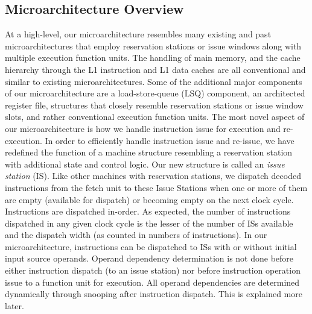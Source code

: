 \documentclass[10pt,dvips]{article}
\begin{document}
\subsection{Microarchitecture Overview}
%
At a high-level, our microarchitecture resembles many existing
and past microarchitectures that employ reservation stations
or issue windows along with multiple execution function units.
The handling of main memory, and the cache hierarchy 
through the L1 instruction and L1 data caches are all
conventional and similar to existing microarchitectures.
Some of the additional major components of our
microarchitecture are a
load-store-queue (LSQ) component, an architected register file,
structures that closely resemble reservation stations or issue
window slots, and rather conventional execution function units.
The most novel aspect of our microarchitecture is how we
handle instruction issue for execution and re-execution.
In order to efficiently handle instruction issue and re-issue,
we have redefined the function of a machine structure
resembling a reservation station with additional state and control
logic.  
Our new structure is called 
an \textit{issue station} (IS).
Like other machines with reservation stations, we dispatch 
decoded instructions from the fetch unit to these Issue Stations
when one or more of them are empty (available for dispatch) or 
becoming empty on the next clock cycle.  
Instructions are dispatched in-order.
As expected, the number of instructions dispatched in any 
given clock cycle is
the lesser of the number of ISs available and the
dispatch width (as counted in numbers of instructions).
In our microarchitecture, instructions can be dispatched to
ISs with or without initial input source operands.
Operand dependency determination is not done before
either instruction dispatch (to an issue station) nor
before instruction operation issue to a function unit for
execution.
All operand dependencies are determined dynamically through
snooping after instruction dispatch.
This is explained more later.
\end{document}
